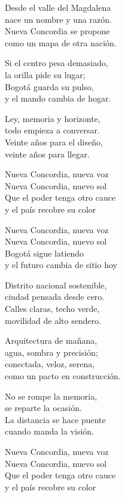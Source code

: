 \begin{lyrics}
Desde el valle del Magdalena\\
nace un nombre y una razón.\\
Nueva Concordia se propone\\
como un mapa de otra nación.

Si el centro pesa demasiado,\\
la orilla pide su lugar;\\
Bogotá guarda su pulso,\\
y el mando cambia de hogar.

Ley, memoria y horizonte,\\
todo empieza a conversar.\\
Veinte años para el diseño,\\
veinte años para llegar.

Nueva Concordia, nueva voz\\
Nueva Concordia, nuevo sol\\
Que el poder tenga otro cauce\\
y el país recobre su color

Nueva Concordia, nueva voz\\
Nueva Concordia, nuevo sol\\
Bogotá sigue latiendo\\
y el futuro cambia de sitio hoy

Distrito nacional sostenible,\\
ciudad pensada desde cero.\\
Calles claras, techo verde,\\
movilidad de alto sendero.

Arquitectura de mañana,\\
agua, sombra y precisión;\\
conectada, veloz, serena,\\
como un pacto en construcción.

No se rompe la memoria,\\
se reparte la ocasión.\\
La distancia se hace puente\\
cuando manda la visión.

Nueva Concordia, nueva voz\\
Nueva Concordia, nuevo sol\\
Que el poder tenga otro cauce\\
y el país recobre su color


\end{lyrics}
